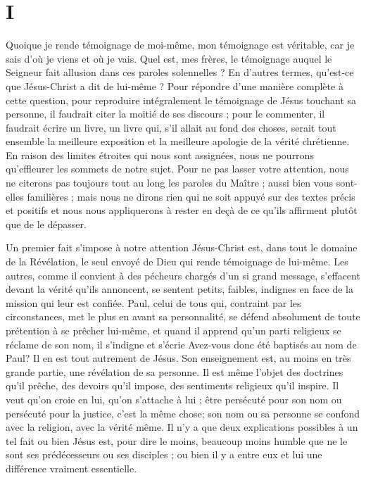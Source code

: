\clearpage
\section{I}

\Og{} Quoique je rende témoignage de moi-même, mon témoignage est véritable, car je sais d’où je viens et où je vais.\Fg{} Quel est, mes frères, le témoignage auquel le Seigneur fait allusion dans ces paroles solennelles ? En d’autres termes, qu’est-ce que Jésus-Christ a dit de lui-même ? \ocadr{} Pour répondre d’une manière complète à cette question, pour reproduire intégralement le témoignage de Jésus touchant sa personne, il faudrait citer la moitié de ses discours ; pour le commenter, il faudrait écrire un livre, un livre qui, s’il allait au fond des choses, serait tout ensemble la meilleure exposition et la meilleure apologie de la vérité chrétienne. En raison des limites étroites qui nous sont assignées, nous ne pourrons qu’effleurer les sommets de notre sujet. Pour ne pas lasser votre attention, nous ne citerons pas toujours tout au long les paroles du Maître ; aussi bien vous sont-elles familières ; mais nous ne dirons rien qui ne soit appuyé sur des textes précis et positifs et nous nous appliquerons à rester en deçà de ce qu’ils affirment plutôt que de le dépasser.

Un premier fait s’impose à notre attention\frcolon{} Jésus-Christ est, dans tout le domaine de la Révélation, le seul envoyé de Dieu qui rende témoignage de lui-même. Les autres, comme il convient à des pécheurs chargés d’un si grand message, s’effacent devant la vérité qu’ils annoncent, se sentent petits, faibles, indignes en face de la mission qui leur est confiée. Paul, celui de tous qui, contraint par les circonstances, met le plus en avant sa personnalité, se défend absolument de toute prétention à se prêcher lui-même, et quand il apprend qu’un parti religieux se réclame de son nom, il s’indigne et s’écrie\frcolon{} \Og{} Avez-vous donc été baptisés au nom de Paul?\Fg{} Il en est tout autrement de Jésus. Son enseignement est, au moins en très grande partie, une révélation de sa personne. Il est même l’objet des doctrines qu’il prêche, des devoirs qu’il impose, des sentiments religieux qu’il inspire. Il veut qu’on croie en lui, qu’on s’attache à lui ; être persécuté pour son nom ou persécuté pour la justice, c’est la même chose; son nom ou sa personne se confond avec la religion, avec la vérité même. Il n’y a que deux explications possibles à un tel fait\frcolon{} ou bien Jésus est, pour dire le moins, beaucoup moins humble que ne le sont ses prédécesseurs ou ses disciples ; ou bien il y a entre eux et lui une différence vraiment essentielle.

